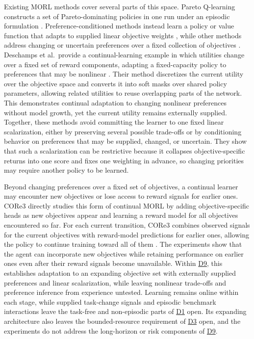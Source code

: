 \documentclass[10pt,journal,compsoc]{IEEEtran}
\DeclareRobustCommand{\Dref}[1]{\hyperref[sec:d#1]{D#1}}
\begin{document}
Existing MORL methods cover several parts of this space.
Pareto Q-learning constructs a set of Pareto-dominating policies in one run under an episodic formulation \cite{vanmoffaert2014}.
Preference-conditioned methods instead learn a policy or value function that adapts to supplied linear objective weights \cite{abels2019,yang2019}, while other methods address changing or uncertain preferences over a fixed collection of objectives \cite{natarajan2005,buetgolfouse2023}.
Deschamps et al.\ provide a continual-learning example in which utilities change over a fixed set of reward components, adapting a fixed-capacity policy to preferences that may be nonlinear \cite{deschamps2026}.
Their method discretizes the current utility over the objective space and converts it into soft masks over shared policy parameters, allowing related utilities to reuse overlapping parts of the network.
This demonstrates continual adaptation to changing nonlinear preferences without model growth, yet the current utility remains externally supplied.
Together, these methods avoid committing the learner to one fixed linear scalarization, either by preserving several possible trade-offs or by conditioning behavior on preferences that may be supplied, changed, or uncertain.
They show that such a scalarization can be restrictive because it collapses objective-specific returns into one score and fixes one weighting in advance, so changing priorities may require another policy to be learned.

Beyond changing preferences over a fixed set of objectives, a continual learner may encounter new objectives or lose access to reward signals for earlier ones.
CORe3 directly studies this form of continual MORL by adding objective-specific heads as new objectives appear and learning a reward model for all objectives encountered so far.
For each current transition, CORe3 combines observed signals for the current objectives with reward-model predictions for earlier ones, allowing the policy to continue training toward all of them \cite{li2024a}.
The experiments show that the agent can incorporate new objectives while retaining performance on earlier ones even after their reward signals become unavailable.
Within \Dref{9}, this establishes adaptation to an expanding objective set with externally supplied preferences and linear scalarization, while leaving nonlinear trade-offs and preference inference from experience untested.
Learning remains online within each stage, while supplied task-change signals and episodic benchmark interactions leave the task-free and non-episodic parts of \Dref{1} open.
Its expanding architecture also leaves the bounded-resource requirement of \Dref{3} open, and the experiments do not address the long-horizon or risk components of \Dref{9}.
\end{document}

